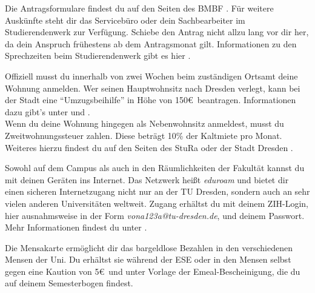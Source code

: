 \begin{itemize}[leftmargin=*]
Die Antragsformulare findest du auf den Seiten des BMBF
. Für weitere
Auskünfte steht dir das Servicebüro oder dein Sachbearbeiter im
Studierendenwerk zur Verfügung. Schiebe den Antrag nicht allzu lang vor dir
her, da dein Anspruch frühestens ab dem Antragsmonat gilt. Informationen zu den
Sprechzeiten beim Studierendenwerk gibt es hier
.

\pagebreak

Offiziell musst du innerhalb von zwei Wochen beim zuständigen Ortsamt
deine Wohnung anmelden. Wer seinen Hauptwohnsitz nach Dresden verlegt, kann bei
der Stadt eine \enquote{Umzugsbeihilfe} in Höhe von 150\euro\ beantragen.
Informationen dazu gibt's unter
 und
. \\
Wenn du deine Wohnung hingegen als Nebenwohnsitz anmeldest, musst du
Zweitwohnungssteuer zahlen. Diese beträgt 10\% der Kaltmiete pro Monat.
Weiteres hierzu findest du auf den Seiten des StuRa
 oder der Stadt
Dresden
.

Sowohl auf dem Campus als auch in den Räumlichkeiten der Fakultät kannst du mit
deinen Geräten ins Internet. Das Netzwerk heißt \textit{eduroam} und bietet dir
einen sicheren Internetzugang nicht nur an der TU Dresden, sondern auch an sehr
vielen anderen Universitäten weltweit. Zugang erhältst du mit deinem ZIH-Login,
hier ausnahmsweise in der Form \textit{vona123a@tu-dresden.de}, und deinem
Passwort. Mehr Informationen findest du unter
.

Die Mensakarte ermöglicht dir das bargeldlose Bezahlen in den verschiedenen
Mensen der Uni. Du erhältst sie während der ESE oder in den Mensen selbst gegen
eine Kaution von 5\euro\ und unter Vorlage der Emeal-Bescheinigung, die du auf
deinem Semesterbogen findest.


\end{itemize}
